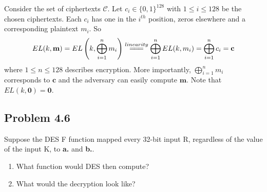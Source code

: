 \documentclass[../hw_sols.tex]{subfiles}
\begin{document}
\begin{solution}
Consider the set of ciphertexts $\mathcal{C}$. Let $c_i \in \{0,1\}^{128}$ 
with $1 \leq i \leq 128$ be the chosen ciphertexts.  Each $c_i$ has one in 
the $i^{th}$ position, zeros elsewhere and a corresponding plaintext $m_i$. 
So
	\[ EL(k,\mathbf{m}) 
	= EL \left( k, \bigoplus_{i=1}^n m_i \right) 
	\stackrel{linearity}{=\joinrel=\joinrel=} 
	\bigoplus_{i=1}^n EL(k,m_i) 
	= \bigoplus_{i=1}^n c_i 
	= \mathbf{c} \]
where $1 \leq n \leq 128$ describes encryption. More importantly, 
$\displaystyle \bigoplus_{i=1}^n m_i$ corresponds to $\mathbf{c}$ and the 
adversary can easily compute $\mathbf{m}$. Note that 
$EL(k,\mathbf{0}) = \mathbf{0}$.
\end{solution}


\newpage



\subsection*{Problem 4.6}

Suppose the DES F function mapped every 32-bit input R, regardless of the 
value of the input K, to \textbf{a.} and \textbf{b.}.
\begin{enumerate}
	\item What function would DES then compute?
	\item What would the decryption look like?
\end{enumerate}
\end{document}
